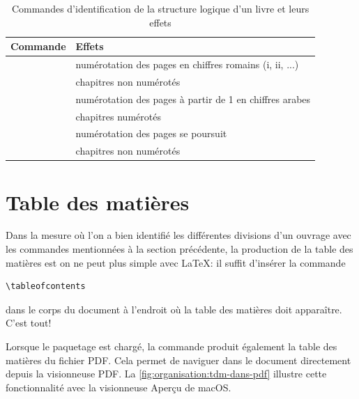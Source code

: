 \begin{table}
  \centering
  \caption{Commandes d'identification de la structure logique d'un
    livre et leurs effets}
  \label{tab:organisation:livre}
  \begin{tabular}{ll}
    \toprule
    Commande & Effets \\
    \midrule
    \cmd{\frontmatter} & numérotation des
                              pages en chiffres romains (i, ii, ...) \\
             & chapitres non numérotés \\
    \addlinespace[0.5\normalbaselineskip]
    \cmd{\mainmatter} & numérotation des pages
                             à partir de 1 en chiffres arabes \\
             & chapitres numérotés \\
    \addlinespace[0.5\normalbaselineskip]
    \cmd{\backmatter} & numérotation des pages
                             se poursuit \\
             & chapitres non numérotés \\
    \bottomrule
  \end{tabular}
\end{table}


\section{Table des matières}
\label{sec:organisation:tdm}

Dans la mesure où l'on a bien identifié les différentes divisions d'un
ouvrage avec les commandes mentionnées à la section précédente, la
production de la table des matières est on ne peut plus simple avec
{\LaTeX}: il suffit d'insérer la commande
\begin{lstlisting}
\tableofcontents
\end{lstlisting}
dans le corps du document à l'endroit où la table des matières doit
apparaître. C'est tout!

Lorsque le paquetage  \citep{hyperref} est chargé, la
commande \cmdprint{\tableofcontents} produit également la table des
matières du fichier PDF. Cela permet de naviguer dans le document
directement depuis la visionneuse PDF. La
\autoref{fig:organisation:tdm-dans-pdf} illustre cette fonctionnalité
avec la visionneuse Aperçu de macOS.

